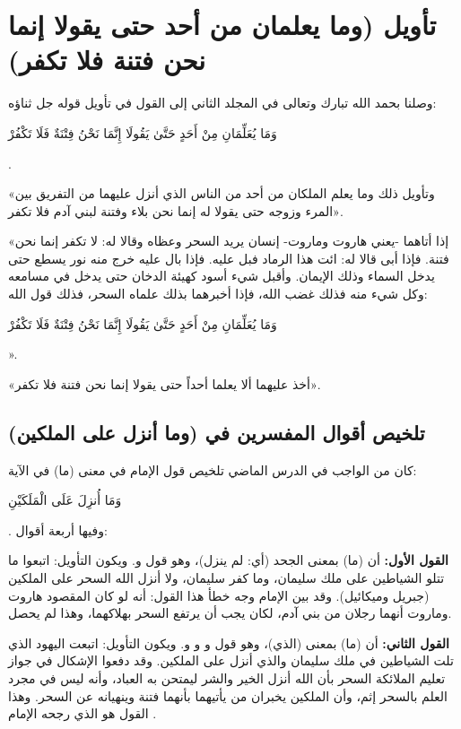 \separator

\section{تأويل (وما يعلمان من أحد حتى يقولا إنما نحن فتنة فلا تكفر)}
وصلنا بحمد الله تبارك وتعالى في المجلد الثاني إلى القول في تأويل قوله جل ثناؤه: \begin{ayah}وَمَا يُعَلِّمَانِ مِنْ أَحَدٍ حَتَّىٰ يَقُولَا إِنَّمَا نَحْنُ فِتْنَةٌ فَلَا تَكْفُرْ\end{ayah}.

 «وتأويل ذلك وما يعلم الملكان من أحد من الناس الذي أنزل عليهما من التفريق بين المرء وزوجه حتى يقولا له إنما نحن بلاء وفتنة لبني آدم فلا تكفر».

     «إذا أتاهما -يعني هاروت وماروت- إنسان يريد السحر وعظاه وقالا له: لا تكفر إنما نحن فتنة. فإذا أبى قالا له: ائت هذا الرماد فبل عليه. فإذا بال عليه خرج منه نور يسطع حتى يدخل السماء وذلك الإيمان. وأقبل شيء أسود كهيئة الدخان حتى يدخل في مسامعه وكل شيء منه فذلك غضب الله، فإذا أخبرهما بذلك علماه السحر، فذلك قول الله: \begin{ayah}وَمَا يُعَلِّمَانِ مِنْ أَحَدٍ حَتَّىٰ يَقُولَا إِنَّمَا نَحْنُ فِتْنَةٌ فَلَا تَكْفُرْ\end{ayah}».

    «أخذ عليهما ألا يعلما أحداً حتى يقولا إنما نحن فتنة فلا تكفر».

\subsection{تلخيص أقوال المفسرين في (وما أنزل على الملكين)}
كان من الواجب في الدرس الماضي تلخيص قول الإمام  في معنى (ما) في الآية: \begin{ayah}وَمَا أُنزِلَ عَلَى الْمَلَكَيْنِ\end{ayah}. وفيها أربعة أقوال:

\textbf{القول الأول:} أن (ما) بمعنى الجحد (أي: لم ينزل)، وهو قول  و. ويكون التأويل: اتبعوا ما تتلو الشياطين على ملك سليمان، وما كفر سليمان، ولا أنزل الله السحر على الملكين (جبريل وميكائيل). 
وقد بين الإمام  وجه خطأ هذا القول: أنه لو كان المقصود هاروت وماروت أنهما رجلان من بني آدم، لكان يجب أن يرتفع السحر بهلاكهما، وهذا لم يحصل.

\textbf{القول الثاني:} أن (ما) بمعنى (الذي)، وهو قول  و و و. ويكون التأويل: اتبعت اليهود الذي تلت الشياطين في ملك سليمان والذي أنزل على الملكين. 
وقد دفعوا الإشكال في جواز تعليم الملائكة السحر بأن الله أنزل الخير والشر ليمتحن به العباد، وأنه ليس في مجرد العلم بالسحر إثم، وأن الملكين يخبران من يأتيهما بأنهما فتنة وينهيانه عن السحر. وهذا القول هو الذي رجحه الإمام .

